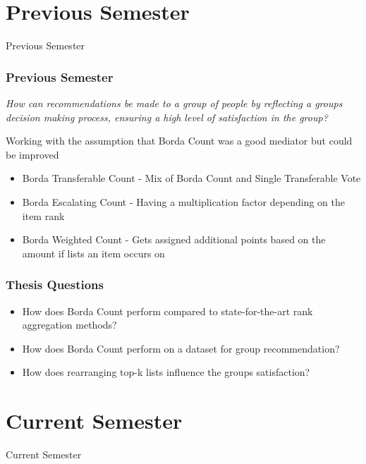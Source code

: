\section{Previous Semester}
\begin{frame}
     \begin{center}
     	\huge Previous Semester
     \end{center}
\end{frame}

\begin{frame}
\frametitle{Previous Semester}
\begin{center}
\textit{How can recommendations be made to a group of people by reflecting a groups decision making process, ensuring a high level of satisfaction in the group?}
\end{center}

Working with the assumption that Borda Count was a good mediator but could be improved

\begin{itemize}
\item Borda Transferable Count - Mix of Borda Count and Single Transferable Vote
\item Borda Escalating Count - Having a multiplication factor depending on the item rank
\item Borda Weighted Count - Gets assigned additional points based on the amount if lists an item occurs on
\end{itemize}
\end{frame}

\begin{frame}
\frametitle{Thesis Questions}
\begin{itemize}
\item How does Borda Count perform compared to state-for-the-art rank aggregation methods?
\item How does Borda Count perform on a dataset for group recommendation?
\item How does rearranging top-k lists influence the groups satisfaction?
\end{itemize}
\end{frame}

\section{Current Semester}
\begin{frame}
     \begin{center}
     	\huge Current Semester
     \end{center}
\end{frame}

